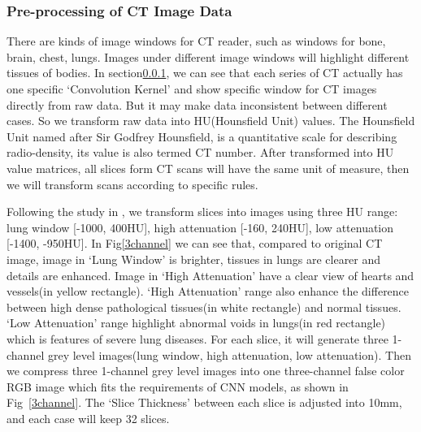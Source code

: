 \documentclass[journal]{IEEEtran}
\begin{document}
\subsubsection{Pre-processing of CT Image Data}
\label{ctimagedata}
There are kinds of image windows for CT reader, such as windows for bone, brain, chest, lungs. Images under different image windows will highlight different tissues of bodies.
In section\ref{ctimagedata}, we can see that each series of CT actually has one specific `Convolution Kernel' and show specific window for CT images directly from raw data. But it may make data inconsistent between different cases. So we transform raw data into HU(Hounsfield Unit) values. The Hounsfield Unit named after Sir Godfrey Hounsfield, is a quantitative scale for describing radio-density, its value is also termed CT number. After transformed into HU value matrices, all slices form CT scans will have the same unit of measure, then we will transform scans according to specific rules.

Following the study in \cite{Shin2017Three} \cite{gao2018holistic}, we transform slices into images using three HU range: lung window [-1000, 400HU], high attenuation [-160, 240HU], low attenuation [-1400, -950HU]. In Fig\ref{3channel} we can see that, compared to original CT image, image in `Lung Window' is brighter, tissues in lungs are clearer and details are enhanced. Image in `High Attenuation' have a clear view of hearts and vessels(in yellow rectangle). `High Attenuation' range also enhance the difference between high dense pathological tissues(in white rectangle) and normal tissues. `Low Attenuation' range highlight abnormal voids in lungs(in red rectangle) which is features of severe lung diseases. 
For each slice, it will generate three 1-channel grey level images(lung window, high attenuation, low attenuation). Then we compress three 1-channel grey level images into one three-channel false color RGB image which fits the requirements of CNN models, as shown in Fig~\ref{3channel}. The `Slice Thickness' between each slice is adjusted into 10mm, and each case will keep 32 slices.
\end{document}
